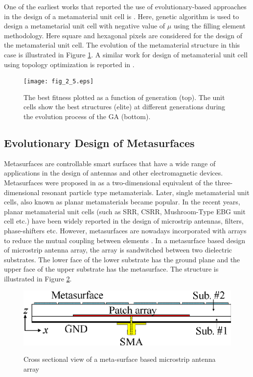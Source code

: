 One of the earliest works that reported the use of evolutionary-based approaches in the design of a metamaterial unit cell is \cite{optMtm}. Here, genetic algorithm is used to design a metametarial unit cell with negative value of $\mu$ using the filling element methodology. Here square and hexagonal pixels are considered for the design of the metamaterial unit cell. The evolution of the metamaterial structure in this case is illustrated in Figure \ref{fig_2_5}. A similar work for design of metamaterial unit cell using topology optimization is reported in \cite{lh_mtm}.

\begin{figure}
  \centering
  \texttt{[image: fig\_2\_5.eps]}\\
  \caption[The best fitness plotted as a function of generation (top). The unit cells show the best structures (elite) at different generations during the evolution process of the GA (bottom)]{The best fitness plotted as a function of generation (top). The unit cells show the best structures (elite) at different generations during the evolution process of the GA (bottom). \cite{optMtm}} \label{fig_2_5}
\end{figure}

\subsection{Evolutionary Design of Metasurfaces}
Metasurfaces are controllable smart surfaces that have a wide range of applications in the design of antennas and other electromagnetic devices. Metasurfaces were proposed in \cite{metasurface1} as a two-dimensional equivalent of the three-dimensional resonant particle type metamaterials. Later, single metamaterial unit cells, also known as planar metamaterials became popular. In the recent years, planar metamaterial unit cells (such as SRR, CSRR, Mushroom-Type EBG unit cell etc.) have been widely reported in the design of microstrip antennas, filters, phase-shifters etc. However, metasurfaces are nowadays incorporated with arrays to reduce the mutual coupling between elements \cite{metasurface2}. In a metasurface based design of microstrip antenna array, the array is sandwitched between two dielectric substrates. The lower face of the lower substrate has the ground plane and the upper face of the upper substrate has the metasurface. The structure is illustrated in Figure \ref{fig_2_6}.

\begin{figure}
  \centering
  \includegraphics[width=0.6\linewidth]{fig_2_6.eps}\\
  \caption [Cross sectional view of a meta-surface based microstrip antenna array]{Cross sectional view of a meta-surface based microstrip antenna array \cite{metasurface2}} \label{fig_2_6}
\end{figure}

